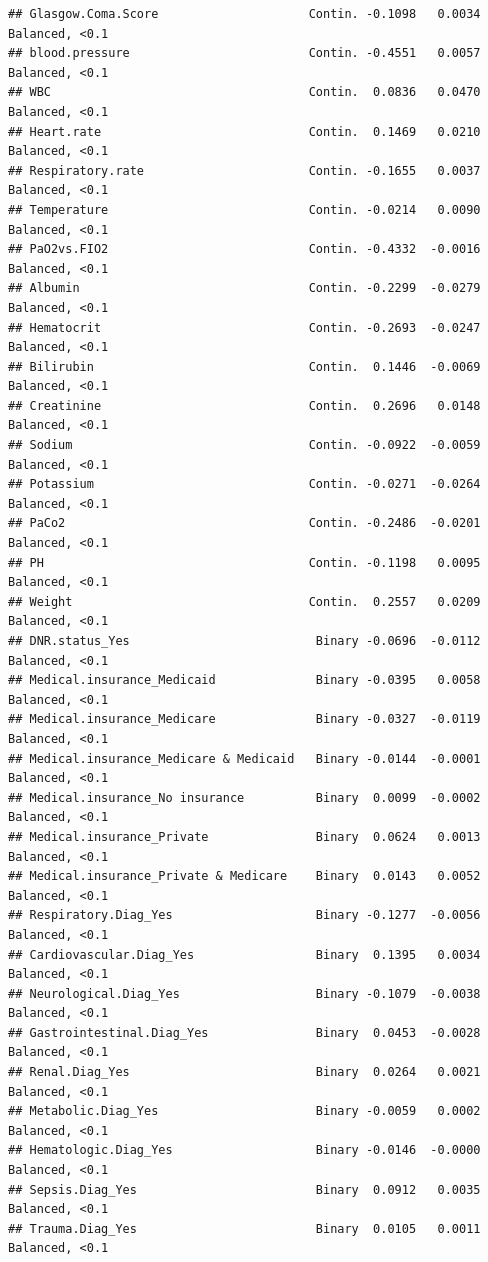 \documentclass[
]{book}
\begin{document}
\begin{verbatim}
## Glasgow.Coma.Score                     Contin. -0.1098   0.0034 Balanced, <0.1
## blood.pressure                         Contin. -0.4551   0.0057 Balanced, <0.1
## WBC                                    Contin.  0.0836   0.0470 Balanced, <0.1
## Heart.rate                             Contin.  0.1469   0.0210 Balanced, <0.1
## Respiratory.rate                       Contin. -0.1655   0.0037 Balanced, <0.1
## Temperature                            Contin. -0.0214   0.0090 Balanced, <0.1
## PaO2vs.FIO2                            Contin. -0.4332  -0.0016 Balanced, <0.1
## Albumin                                Contin. -0.2299  -0.0279 Balanced, <0.1
## Hematocrit                             Contin. -0.2693  -0.0247 Balanced, <0.1
## Bilirubin                              Contin.  0.1446  -0.0069 Balanced, <0.1
## Creatinine                             Contin.  0.2696   0.0148 Balanced, <0.1
## Sodium                                 Contin. -0.0922  -0.0059 Balanced, <0.1
## Potassium                              Contin. -0.0271  -0.0264 Balanced, <0.1
## PaCo2                                  Contin. -0.2486  -0.0201 Balanced, <0.1
## PH                                     Contin. -0.1198   0.0095 Balanced, <0.1
## Weight                                 Contin.  0.2557   0.0209 Balanced, <0.1
## DNR.status_Yes                          Binary -0.0696  -0.0112 Balanced, <0.1
## Medical.insurance_Medicaid              Binary -0.0395   0.0058 Balanced, <0.1
## Medical.insurance_Medicare              Binary -0.0327  -0.0119 Balanced, <0.1
## Medical.insurance_Medicare & Medicaid   Binary -0.0144  -0.0001 Balanced, <0.1
## Medical.insurance_No insurance          Binary  0.0099  -0.0002 Balanced, <0.1
## Medical.insurance_Private               Binary  0.0624   0.0013 Balanced, <0.1
## Medical.insurance_Private & Medicare    Binary  0.0143   0.0052 Balanced, <0.1
## Respiratory.Diag_Yes                    Binary -0.1277  -0.0056 Balanced, <0.1
## Cardiovascular.Diag_Yes                 Binary  0.1395   0.0034 Balanced, <0.1
## Neurological.Diag_Yes                   Binary -0.1079  -0.0038 Balanced, <0.1
## Gastrointestinal.Diag_Yes               Binary  0.0453  -0.0028 Balanced, <0.1
## Renal.Diag_Yes                          Binary  0.0264   0.0021 Balanced, <0.1
## Metabolic.Diag_Yes                      Binary -0.0059   0.0002 Balanced, <0.1
## Hematologic.Diag_Yes                    Binary -0.0146  -0.0000 Balanced, <0.1
## Sepsis.Diag_Yes                         Binary  0.0912   0.0035 Balanced, <0.1
## Trauma.Diag_Yes                         Binary  0.0105   0.0011 Balanced, <0.1

\end{verbatim}
\end{document}

